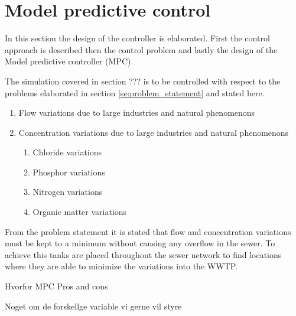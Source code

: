 \section{Model predictive control}\label{se:model_predictive_control}
In this section the design of the controller is elaborated. First the control approach is described then the control problem and lastly the design of the Model predictive controller (MPC). 

The simulation covered in section ??? is to be controlled with respect to the problems elaborated in section \ref{se:problem_statement} and stated here. 
\begin{enumerate}
\item Flow variations due to large industries and natural phenomenons
\item Concentration variations due to large industries and natural phenomenons
\begin{enumerate}
	\item Chloride variations
	\item Phosphor variations
	\item Nitrogen variations
	\item Organic matter variations
\end{enumerate}
\end{enumerate}

From the problem statement it is stated that flow and concentration variations must be kept to a minimum without causing any overflow in the sewer. To achieve this tanks are placed throughout the sewer network to find locations where they are able to minimize the variations into the WWTP. 



Hvorfor MPC
	Pros and cons




Noget om de forskellge variable vi gerne vil styre



